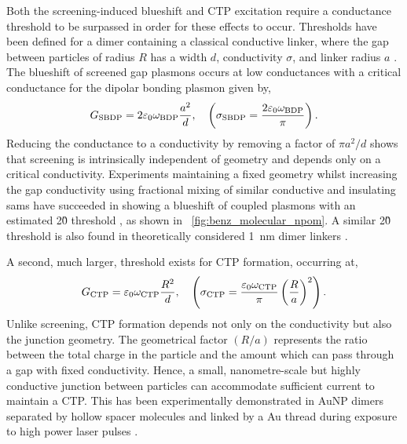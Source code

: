\documentclass{article}
\begin{document}
Both the screening-induced blueshift and CTP excitation require a conductance threshold to be surpassed in order for these effects to occur. Thresholds have been defined for a dimer containing a classical conductive linker, where the gap between particles of radius $R$ has a width $d$, conductivity $\sigma$, and linker radius $a$ \cite{perez2010, perez2011}. The blueshift of screened gap plasmons occurs at low conductances with a critical conductance for the dipolar bonding plasmon given by,
\begin{equation}
	G_{\mathrm{SBDP}} = 2\varepsilon_0\omega_{\mathrm{BDP}}\frac{a^2}{d}, \quad \left( \sigma_{\mathrm{SBDP}} = \frac{2\varepsilon_0\omega_{\mathrm{BDP}}}{\pi} \right).
\end{equation}
Reducing the conductance to a conductivity by removing a factor of $\pi a^2/d$ shows that screening is intrinsically independent of geometry and depends only on a critical conductivity. Experiments maintaining a fixed geometry whilst increasing the gap conductivity using fractional mixing of similar conductive and insulating \glspl{sam} have succeeded in showing a blueshift of coupled plasmons with an estimated 2\G0 threshold \cite{benz2014}, as shown in \figurename~\ref{fig:benz_molecular_npom}. A similar 2\G0 threshold is also found in theoretically considered \SI{1}{nm} dimer linkers \cite{perez2010}.

A second, much larger, threshold exists for CTP formation, occurring at,
\begin{equation}
	G_{\mathrm{CTP}} = \varepsilon_0\omega_{\mathrm{CTP}}\frac{R^2}{d}, \quad \left( \sigma_{\mathrm{CTP}} = \frac{\varepsilon_0\omega_{\mathrm{CTP}}}{\pi} \left(\frac{R}{a}\right)^2 \right).
\end{equation}
Unlike screening, CTP formation depends not only on the conductivity but also the junction geometry. The geometrical factor $(R/a)$ represents the ratio between the total charge in the particle and the amount which can pass through a gap with fixed conductivity. Hence, a small, nanometre-scale but highly conductive junction between particles can accommodate sufficient current to maintain a CTP. This has been experimentally demonstrated in AuNP dimers separated by hollow spacer molecules and linked by a Au thread during exposure to high power laser pulses \cite{herrmann2014, tserkezis2014}.
\end{document}
